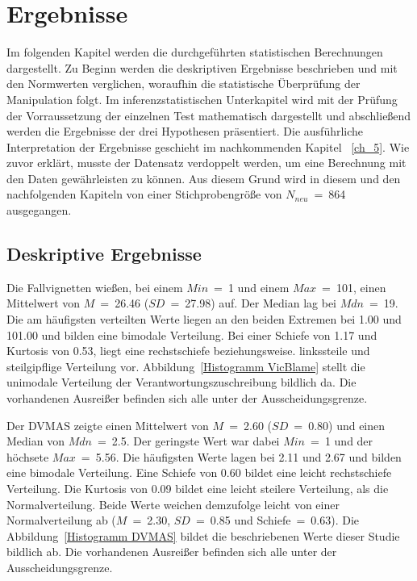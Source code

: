\chapter{Ergebnisse}   \label{ch_4}
Im folgenden Kapitel werden die durchgeführten statistischen Berechnungen dargestellt. Zu Beginn werden die deskriptiven Ergebnisse beschrieben und mit den Normwerten verglichen, woraufhin die statistische Überprüfung der Manipulation folgt. Im inferenzstatistischen Unterkapitel wird mit der Prüfung der Vorraussetzung der einzelnen Test mathematisch dargestellt und abschließend werden die Ergebnisse der drei Hypothesen präsentiert. Die ausführliche Interpretation der Ergebnisse geschieht im nachkommenden Kapitel ~\ref{ch_5}. 
Wie zuvor erklärt, musste der Datensatz verdoppelt werden, um eine Berechnung mit den Daten gewährleisten zu können. Aus diesem Grund wird in diesem und den nachfolgenden Kapiteln von einer Stichprobengröße von $N_{neu}$~=~864 ausgegangen.

\section{Deskriptive Ergebnisse}    \label{sec_4.1}
Die Fallvignetten wießen, bei einem $Min$~=~1 und einem $Max$~=~101, einen Mittelwert von $M$~=~26.46 ($SD$~=~27.98) auf. Der Median lag bei $Mdn$~=~19. Die am häufigsten verteilten Werte liegen an den beiden Extremen bei 1.00 und 101.00 und bilden eine bimodale Verteilung. Bei einer Schiefe von 1.17 und Kurtosis von 0.53, liegt eine rechstschiefe beziehungsweise. linkssteile und steilgipflige Verteilung vor. Abbildung~\ref{Histogramm VicBlame} stellt die unimodale Verteilung der Verantwortungszuschreibung bildlich da. Die vorhandenen Ausreißer befinden sich alle unter der Ausscheidungsgrenze.


Der DVMAS zeigte einen Mittelwert von $M$~=~2.60 ($SD$~=~0.80) und einen Median von $Mdn$~=~2.5. Der geringste Wert war dabei $Min$~=~1 und der höchsete $Max$~=~5.56. Die häufigsten Werte lagen bei 2.11 und 2.67 und bilden eine bimodale Verteilung. Eine Schiefe von 0.60 bildet eine leicht rechstschiefe Verteilung. Die Kurtosis von 0.09 bildet eine leicht steilere Verteilung, als die Normalverteilung. Beide Werte weichen demzufolge leicht von einer Normalverteilung ab ($M$~=~2.30, $SD$~=~0.85 und Schiefe~=~0.63). 
Die Abbildung~\ref{Histogramm DVMAS} bildet die beschriebenen Werte dieser Studie bildlich ab. Die vorhandenen Ausreißer befinden sich alle unter der Ausscheidungsgrenze.


